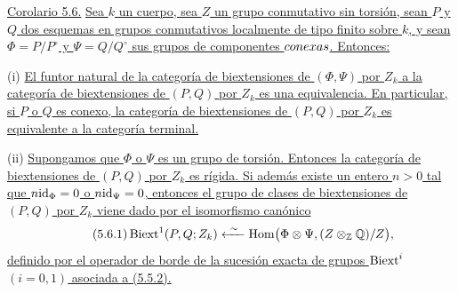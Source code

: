 \medskip
\noindent\underline{Corolario 5.6.} \underline{Sea $k$ un cuerpo, sea
$Z$ un grupo conmutativo sin torsión, sean $P$ y $Q$ dos esquemas en
grupos conmutativos localmente de tipo finito sobre $k$, y sean
$\Phi=P/P^\circ$ y $\Psi=Q/Q^\circ$ sus grupos de componentes
$\sisi{neutras}{conexas}$. Entonces:}


\smallskip
\noindent (i) \underline{El funtor natural de la categoría de
biextensiones de $(\Phi,\Psi)$ por $Z_k$ a la categoría de
biextensiones de $(P,Q)$ por $Z_k$ es una equivalencia. En particular,
si $P$ o $Q$ es conexo, la categoría de biextensiones de $(P,Q)$ por
$Z_k$ es equivalente a la categoría terminal.}

\smallskip
\noindent (ii) \underline{Supongamos que $\Phi$ o $\Psi$ es un grupo
de torsión. Entonces la categoría de biextensiones de $(P,Q)$ por
$Z_k$ es rígida. Si además existe un entero $n>0$ tal que
$n\id_\Phi=0$ o $n\id_\Psi=0$, entonces el grupo de clases de
biextensiones de $(P,Q)$ por $Z_k$ viene dado por el isomorfismo
canónico}
\begin{equation}\tag{5.6.1}
 \Biext^1(P,Q;\sisi{G_k}{Z_k})
 \xleftarrow{\ \sim\ }
 \Hom\bigl(\Phi\otimes\Psi,
 (Z\otimes_{\mathbb Z}\mathbb Q)/Z\bigr),
\end{equation}
\underline{definido por el operador de borde de la sucesión exacta de
grupos $\Biext^i$ $(i=0,1)$ asociada a (5.5.2).}
